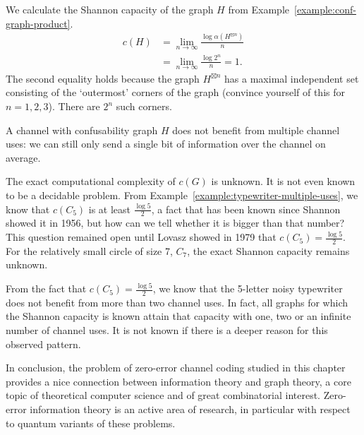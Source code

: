 \begin{example}
We calculate the Shannon capacity of the graph $H$ from Example~\ref{example:conf-graph-product}.
\begin{align*}
c(H) &=  \lim_{n \to \infty} \frac{\log \alpha(H^{\boxtimes n})}{n}\\
&= \lim_{n \to \infty} \frac{\log 2^n}{n} = 1.
\end{align*}
The second equality holds because the graph $H^{\boxtimes n}$ has a maximal independent set consisting of the `outermost' corners of the graph (convince yourself of this for $n = 1, 2, 3$). There are $2^n$ such corners.

A channel with confusability graph $H$ does not benefit from multiple channel uses: we can still only send a single bit of information over the channel on average.
\end{example}

The exact computational complexity of $c(G)$ is unknown. It is not even known to be a decidable problem. From Example~\ref{example:typewriter-multiple-uses}, we know that $c(C_5)$ is at least $\frac{\log 5}{2}$, a fact that has been known since Shannon showed it in 1956, but how can we tell whether it is bigger than that number? This question remained open until Lovasz showed in 1979 that $c(C_5) = \frac{\log 5}{2}$. For the relatively small circle of size 7, $C_7$, the exact Shannon capacity remains unknown.

From the fact that $c(C_5) = \frac{\log 5}{2}$, we know that the
5-letter noisy typewriter does not benefit from more than two channel
uses. In fact, all graphs for which the Shannon capacity is known
attain that capacity with one, two or an infinite number of channel
uses. It is not known if there is a deeper reason for this observed
pattern.

In conclusion, the problem of zero-error channel coding studied in this chapter provides a nice connection between information theory and graph theory, a core topic of theoretical computer science and of great combinatorial interest. Zero-error information theory is an active area of research, in particular with respect to quantum variants of these problems.


